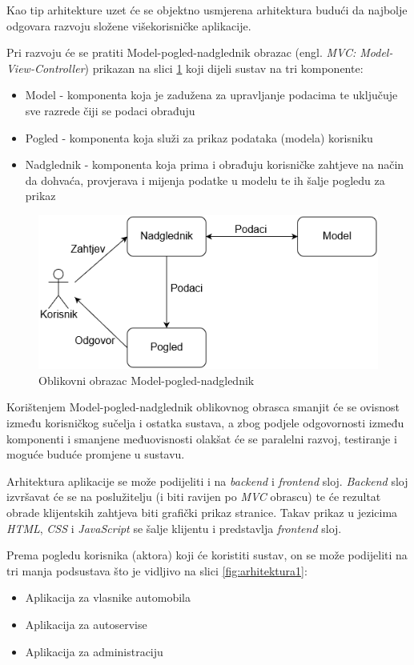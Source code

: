 		
		Kao tip arhitekture uzet će se objektno usmjerena arhitektura budući da najbolje odgovara razvoju složene višekorisničke aplikacije. 
		
		Pri razvoju će se pratiti Model-pogled-nadglednik obrazac (engl. \textit{MVC: Model-View-Controller}) prikazan na slici \ref{fig:mvc} koji dijeli sustav na tri komponente:
		\begin{itemize}
			\item Model - komponenta koja je zadužena za upravljanje podacima te uključuje sve razrede čiji se podaci obrađuju
			\item Pogled - komponenta koja služi za prikaz podataka (modela) korisniku
			\item Nadglednik - komponenta koja prima i obrađuju korisničke zahtjeve na način da dohvaća, provjerava i mijenja podatke u modelu te ih šalje pogledu za prikaz
		\end{itemize}
		
		\begin{figure}[h]
			\centering
			\includegraphics[width=0.7\linewidth]{slike/mvc}
			\caption{Oblikovni obrazac Model-pogled-nadglednik}
			\label{fig:mvc}
		\end{figure}
		
		Korištenjem Model-pogled-nadglednik oblikovnog obrasca smanjit će se ovisnost između korisničkog sučelja i ostatka sustava, a zbog podjele odgovornosti između komponenti i smanjene međuovisnosti olakšat će se paralelni razvoj, testiranje i moguće buduće promjene u sustavu.
		
		Arhitektura aplikacije se može podijeliti i na \textit{backend} i \textit{frontend} sloj. \textit{Backend} sloj izvršavat će se na poslužitelju (i biti ravijen po \textit{MVC} obrascu) te će rezultat obrade klijentskih zahtjeva biti grafički prikaz stranice. Takav prikaz u jezicima \textit{HTML}, \textit{CSS} i \textit{JavaScript} se šalje klijentu i predstavlja \textit{frontend} sloj.
		
		Prema pogledu korisnika (aktora) koji će koristiti sustav, on se može podijeliti na tri manja podsustava što je vidljivo na slici \ref{fig:arhitektura1}:
		\begin{itemize}
			\item Aplikacija za vlasnike automobila
			\item Aplikacija za autoservise
			\item Aplikacija za administraciju 
		\end{itemize}

